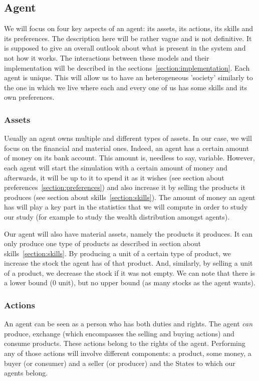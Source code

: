 \documentclass[20pt]{article}
\begin{document}
\subsection{Agent}\label{section:agent}
We will focus on four key aspects of an agent: its assets, its actions, its skills and its preferences. The description here will be rather vague and is not definitive. It is supposed to give an overall outlook about what is present in the system and not how it works. The interactions between these models and their implementation will be described in the sections~\ref{section:implementation}. Each agent is unique. This will allow us to have an heterogeneous 'society' similarly to the one in which we live where each and every one of us has some skills and its own preferences.

\subsubsection{Assets}\label{section:assets}
Usually an agent owns multiple and different types of assets. In our case, we will focus on the financial and material ones. Indeed, an agent has a certain amount of money on its bank account. This amount is, needless to say, variable. 
However, each agent will start the simulation with a certain amount of money and afterwards, it will be up to it to spend it as it wishes (see section about preferences~\ref{section:preferences}) and also increase it by selling the products it produces (see section about skills~\ref{section:skills}). 
The amount of money an agent has will play a key part in the statistics that we will compute in order to study our study (for example to study the wealth distribution amongst agents). 

Our agent will also have material assets, namely the products it produces. It can only produce one type of products as described in section about skills~\ref{section:skills}. By producing a unit of a certain type of product, we increase the stock the agent has of that product. And, similarly, by selling a unit of a product, we decrease the stock if it was not empty. We can note that there is a lower bound (0 unit), but no upper bound (as many stocks as the agent wants).


\subsubsection{Actions}\label{section:actions}
An agent can be seen as a person who has both duties and rights. The agent \emph{can} produce, exchange (which encompasses the selling and buying actions) and consume products. These actions belong to the rights of the agent. Performing any of those actions will involve different components: a product, some money, a buyer (or consumer) and a seller (or producer) and the States to which our agents belong. 
\end{document}
